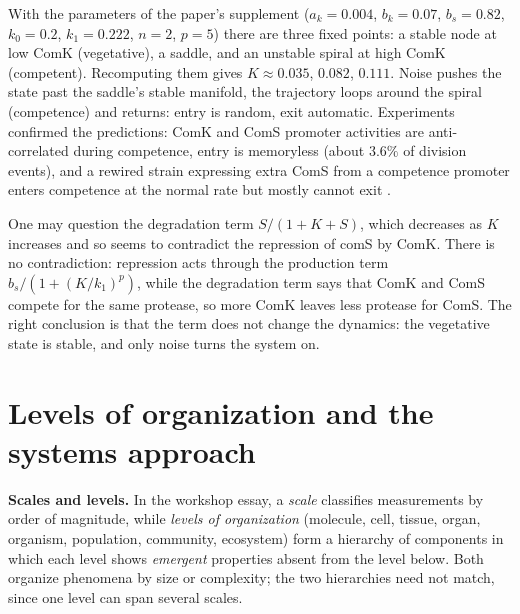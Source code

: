 With the parameters of the paper's
supplement ($a_k=0.004$, $b_k=0.07$,
$b_s=0.82$, $k_0=0.2$, $k_1=0.222$, $n=2$,
$p=5$) there are three fixed points: a
stable node at low ComK (vegetative), a
saddle, and an unstable spiral at high
ComK (competent). Recomputing them gives
$K\approx 0.035$, $0.082$, $0.111$. Noise
pushes the state past the saddle's stable
manifold, the trajectory loops around the
spiral (competence) and returns: entry is
random, exit automatic. Experiments
confirmed the predictions: ComK and ComS
promoter activities are anti-correlated
during competence, entry is memoryless
(about $3.6\%$ of division events), and a
rewired strain expressing extra ComS from
a competence promoter enters competence at
the normal rate but mostly cannot exit
\cite{suel2006excitable}.

\begin{remark}
\label{remark-coms-term}
One may question
the degradation term $S/(1+K+S)$, which
decreases as $K$ increases and so seems to
contradict the repression of comS by ComK.
There is no contradiction: repression acts
through the production term
$b_s/(1+(K/k_1)^p)$, while the degradation
term says that ComK and ComS compete for
the same protease, so more ComK leaves less
protease for ComS. The right
conclusion is that the term does not change
the dynamics: the vegetative state is
stable, and only noise turns the system
on.
\end{remark}

\section{Levels of organization and the
systems approach}
\label{section-systems-approach}

\textbf{Scales and levels.}
In the workshop essay, a \emph{scale}
classifies measurements by order of
magnitude, while \emph{levels of
organization} (molecule, cell, tissue,
organ, organism, population, community,
ecosystem) form a hierarchy of components
in which each level shows \emph{emergent}
properties absent from the level below.
Both organize phenomena by size or
complexity; the two hierarchies need not
match, since one level can span several
scales.

